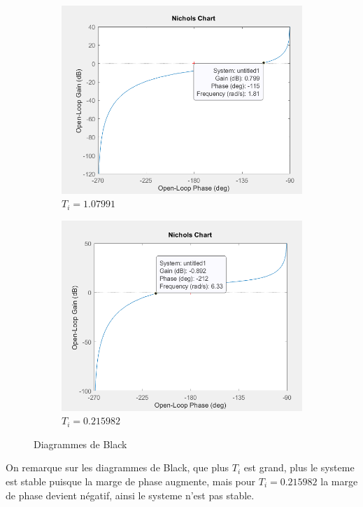 \documentclass[12pt, a4paper]{report}
\begin{document}
\begin{figure}[H]
\begin{subfigure}[h!]{0.4\linewidth}
        \includegraphics[width=\linewidth]{sim2ti3diag.png}
        \caption{$T_i = 1.07991$}
    \end{subfigure}
    \hfill    
    \begin{subfigure}[h!]{0.4\linewidth}
        \includegraphics[width=\linewidth]{sim2ti4diag.png}
        \caption{$T_i = 0.215982$}
    \end{subfigure}
    \caption{Diagrammes de Black}
    \label{fig:sim2Tiblacks}
\end{figure}

On remarque sur les diagrammes de Black, que plus $T_i$ est grand, plus le systeme est stable puisque la marge de phase augmente,
mais pour $T_i = 0.215982$ la marge de phase devient négatif, ainsi le systeme n'est pas stable.
\end{document}
